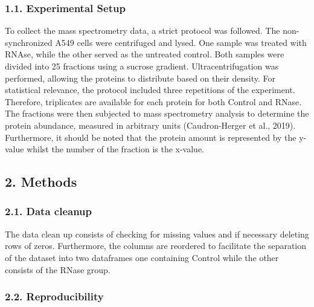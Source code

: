 \documentclass[
  12pt,
]{article}
\begin{document}
\hypertarget{experimental-setup}{%
\subsubsection{1.1. Experimental Setup}\label{experimental-setup}}

To collect the mass spectrometry data, a strict protocol was followed.
The non-synchronized A549 cells were centrifuged and lysed. One sample
was treated with RNAse, while the other served as the untreated control.
Both samples were divided into 25 fractions using a sucrose gradient.
Ultracentrifugation was performed, allowing the proteins to distribute
based on their density. For statistical relevance, the protocol included
three repetitions of the experiment. Therefore, triplicates are
available for each protein for both Control and RNase. The fractions
were then subjected to mass spectrometry analysis to determine the
protein abundance, measured in arbitrary units (Caudron-Herger et al.,
2019). Furthermore, it should be noted that the protein amount is
represented by the y-value whilst the number of the fraction is the
x-value.

\hypertarget{methods}{%
\subsection{2. Methods}\label{methods}}

\hypertarget{data-cleanup}{%
\subsubsection{2.1. Data cleanup}\label{data-cleanup}}

The data clean up consists of checking for missing values and if
necessary deleting rows of zeros. Furthermore, the columns are reordered
to facilitate the separation of the dataset into two dataframes one
containing Control while the other consists of the RNase group.

\hypertarget{reproducibility}{%
\subsubsection{2.2. Reproducibility}\label{reproducibility}}
\end{document}
